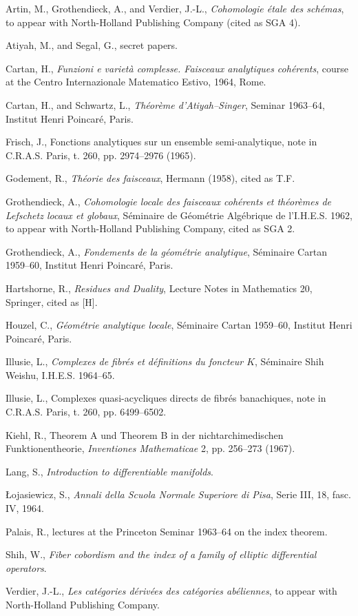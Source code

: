 \documentclass[11pt]{article}
\begin{document}
\begin{enumerate}[label={[\,\arabic*\,]}]
\item Artin, M., Grothendieck, A., and Verdier, J.-L., \emph{Cohomologie étale des schémas}, to appear with North-Holland Publishing Company (cited as SGA 4).
\item Atiyah, M., and Segal, G., secret papers.
\item Cartan, H., \emph{Funzioni e varietà complesse. Faisceaux analytiques cohérents}, course at the Centro Internazionale Matematico Estivo, 1964, Rome.
\item Cartan, H., and Schwartz, L., \emph{Théorème d'Atiyah--Singer}, Seminar 1963--64, Institut Henri Poincaré, Paris.
\item Frisch, J., Fonctions analytiques sur un ensemble semi-analytique, note in C.R.A.S. Paris, t. 260, pp. 2974--2976 (1965).
\item Godement, R., \emph{Théorie des faisceaux}, Hermann (1958), cited as T.F.
\item Grothendieck, A., \emph{Cohomologie locale des faisceaux cohérents et théorèmes de Lefschetz locaux et globaux}, Séminaire de Géométrie Algébrique de l'I.H.E.S. 1962, to appear with North-Holland Publishing Company, cited as SGA 2.
\item Grothendieck, A., \emph{Fondements de la géométrie analytique}, Séminaire Cartan 1959--60, Institut Henri Poincaré, Paris.
\item Hartshorne, R., \emph{Residues and Duality}, Lecture Notes in Mathematics 20, Springer, cited as [H].
\item Houzel, C., \emph{Géométrie analytique locale}, Séminaire Cartan 1959--60, Institut Henri Poincaré, Paris.
\item Illusie, L., \emph{Complexes de fibrés et définitions du foncteur $K$}, Séminaire Shih Weishu, I.H.E.S. 1964--65.
\item Illusie, L., Complexes quasi-acycliques directs de fibrés banachiques, note in C.R.A.S. Paris, t. 260, pp. 6499--6502.
\item Kiehl, R., Theorem A und Theorem B in der nichtarchimedischen Funktionentheorie, \emph{Inventiones Mathematicae} 2, pp. 256--273 (1967).
\item Lang, S., \emph{Introduction to differentiable manifolds}.
\item Łojasiewicz, S., \emph{Annali della Scuola Normale Superiore di Pisa}, Serie III, 18, fasc. IV, 1964.
\item Palais, R., lectures at the Princeton Seminar 1963--64 on the index theorem.
\item Shih, W., \emph{Fiber cobordism and the index of a family of elliptic differential operators}.
\item Verdier, J.-L., \emph{Les catégories dérivées des catégories abéliennes}, to appear with North-Holland Publishing Company.
\end{enumerate}
\end{document}
